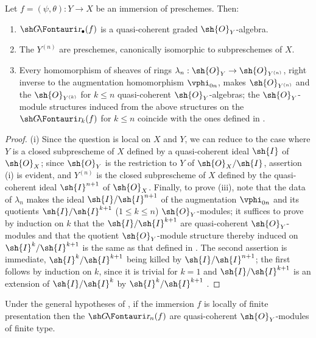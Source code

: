 \begin{proposition}[16.1.5]
\label{IV.16.1.5}
Let $f = (\psi, \theta): Y \to X$ be an immersion of preschemes.
Then:
\begin{enumerate}
  \item[{\rm(i)}] $\shGr_\bullet(f)$ is a quasi-coherent graded $\sh{O}_Y$-algebra.
  \item[{\rm(ii)}] The $Y^{(n)}$ are preschemes, canonically isomorphic to subpreschemes of $X$.
  \item[{\rm(iii)}] Every homomorphism of sheaves of rings $\lambda_n: \sh{O}_Y \to \sh{O}_{Y^{(n)}}$, right inverse to the augmentation homomorphism $\vphi_{0n}$, makes $\sh{O}_{Y^{(n)}}$ and the $\sh{O}_{Y^{(k)}}$ for $k\leq n$ quasi-coherent $\sh{O}_Y$-algebras;
  the $\sh{O}_Y$-module structures induced from the above structures on the $\shGr_k(f)$ for $k \leq n$ coincide with the ones defined in .
\end{enumerate}
\end{proposition}

\begin{proof}
(i) Since the question is local on $X$ and $Y$, we can reduce to the case where $Y$ is a closed subprescheme of $X$ defined by a quasi-coherent ideal $\sh{I}$ of $\sh{O}_X$;
since $\sh{O}_Y$ is the restriction to $Y$ of $\sh{O}_X/\sh{I}$, assertion (i) is evident, and $Y^{(n)}$ is the closed subprescheme of $X$ defined by the quasi-coherent ideal $\sh{I}^{n+1}$ of $\sh{O}_X$.
Finally, to prove (iii), note that the data of $\lambda_n$ makes the ideal $\sh{I}/\sh{I}^{n+1}$ of the augmentation $\vphi_{0n}$ and its quotients $\sh{I}/\sh{I}^{k+1}$ ($1\leq k \leq n$) $\sh{O}_Y$-modules; it suffices to prove by induction on $k$ that the $\sh{I}/\sh{I}^{k+1}$ are quasi-coherent $\sh{O}_Y$-modules and that the quotient $\sh{O}_Y$-module structure thereby induced on $\sh{I}^k/\sh{I}^{k+1}$ is the same as that defined in .
The second assertion is immediate, $\sh{I}^k/\sh{I}^{k+1}$ being killed by $\sh{I}/\sh{I}^{n+1}$;
the first follows by induction on $k$, since it is trivial for $k=1$ and $\sh{I}/\sh{I}^{k+1}$ is an extension of $\sh{I}/\sh{I}^{k}$ by $\sh{I}^k/\sh{I}^{k+1}$ .
\end{proof}

\begin{corollary}[16.1.6]
\label{IV.16.1.6}
Under the general hypotheses of , if the immersion $f$ is locally of finite presentation then the $\shGr_n(f)$ are quasi-coherent $\sh{O}_Y$-modules of finite type.
\end{corollary}

